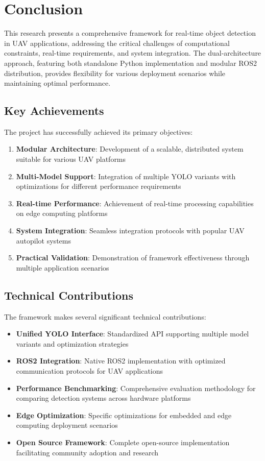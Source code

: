 \documentclass[11pt,a4paper]{article}
\begin{document}
\section{Conclusion}

This research presents a comprehensive framework for real-time object detection in UAV applications, addressing the critical challenges of computational constraints, real-time requirements, and system integration. The dual-architecture approach, featuring both standalone Python implementation and modular ROS2 distribution, provides flexibility for various deployment scenarios while maintaining optimal performance.

\subsection{Key Achievements}

The project has successfully achieved its primary objectives:

\begin{enumerate}
    \item \textbf{Modular Architecture}: Development of a scalable, distributed system suitable for various UAV platforms
    \item \textbf{Multi-Model Support}: Integration of multiple YOLO variants with optimizations for different performance requirements
    \item \textbf{Real-time Performance}: Achievement of real-time processing capabilities on edge computing platforms
    \item \textbf{System Integration}: Seamless integration protocols with popular UAV autopilot systems
    \item \textbf{Practical Validation}: Demonstration of framework effectiveness through multiple application scenarios
\end{enumerate}

\subsection{Technical Contributions}

The framework makes several significant technical contributions:

\begin{itemize}
    \item \textbf{Unified YOLO Interface}: Standardized API supporting multiple model variants and optimization strategies
    \item \textbf{ROS2 Integration}: Native ROS2 implementation with optimized communication protocols for UAV applications
    \item \textbf{Performance Benchmarking}: Comprehensive evaluation methodology for comparing detection systems across hardware platforms
    \item \textbf{Edge Optimization}: Specific optimizations for embedded and edge computing deployment scenarios
    \item \textbf{Open Source Framework}: Complete open-source implementation facilitating community adoption and research
\end{itemize}
\end{document}
